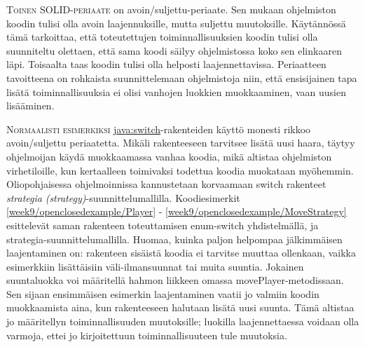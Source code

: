 \documentclass[openany]{book}
\newcommand{\newthought}[1]{\smallskip\textsc{#1}}
\newcommand{\eng}[1]{\textit{(#1)}}
\newcommand{\new}[1]{\textit{\gls{#1}}}
\newcommand{\neweng}[2]{\new{#1} \eng{#2}}
\newcommand{\java}[1]{\underline{\gls{java:#1}}}
\newcommand{\code}[3]{
	\begin{listing}
		\linespread{0.85}
		\inputminted{java}{OhjelmointiopasEsimerkit/src/#1/#2.java}
		\caption{#1: #3}
		\label{#1/#2}
	\end{listing}
}
\begin{document}
\newthought{Toinen SOLID-periaate} on \gls{avoin/suljettu-periaate}. Sen mukaan ohjelmiston
koodin tulisi olla avoin laajennuksille, mutta suljettu muutoksille. Käytännössä tämä tarkoittaa,
että toteutettujen toiminnallisuuksien koodin tulisi olla suunniteltu olettaen, että sama koodi
säilyy ohjelmistossa koko sen elinkaaren läpi. Toisaalta taas koodin tulisi olla helposti
laajennettavissa. Periaatteen tavoitteena on rohkaista suunnittelemaan ohjelmistoja niin, että
ensisijainen tapa lisätä toiminnallisuuksia ei olisi vanhojen luokkien muokkaaminen, vaan uusien
lisääminen.

\newthought{Normaalisti esimerkiksi} \java{switch}-rakenteiden käyttö monesti rikkoo 
avoin/suljettu periaatetta. Mikäli rakenteeseen tarvitsee lisätä uusi haara, täytyy ohjelmoijan
käydä muokkaamassa vanhaa koodia, mikä altistaa ohjelmiston virhetiloille, kun kertaalleen
toimivaksi todettua koodia muokataan myöhemmin. Oliopohjaisessa ohjelmoinnissa kannustetaan
korvaamaan switch rakenteet \neweng{strategia}{strategy}-suunnittelumallilla. Koodiesimerkit
\ref{week9/openclosedexample/Player} - \ref{week9/openclosedexample/MoveStrategy} esittelevät
saman rakenteen toteuttamisen enum-switch yhdistelmällä, ja strategia-suunnittelumallilla. Huomaa,
kuinka paljon helpompaa jälkimmäisen laajentaminen on: rakenteen sisäistä koodia ei tarvitse
muuttaa ollenkaan, vaikka esimerkkiin lisättäisiin väli-ilmansuunnat tai muita suuntia. Jokainen
suuntaluokka voi määritellä hahmon liikkeen omassa movePlayer-metodissaan. Sen sijaan
ensimmäisen esimerkin laajentaminen vaatii jo valmiin koodin muokkaamista aina, kun rakenteeseen
halutaan lisätä uusi suunta. Tämä altistaa jo määritellyn toiminnallisuuden muutoksille; luokilla
laajennettaessa voidaan olla varmoja, ettei jo kirjoitettuun toiminnallisuuteen tule muutoksia.

\code{week9/openclosedexample}{Player}{Pelaaja-luokka, jonka koordinaatteja esimerkissä pyritään
muuttamaan}
\code{week3/enumexample}{CompassPoint}{Ilmansuunnat \java{enum}-luokalla esiteltynä}
\code{week9/openclosedexample}{MoveSwitch}{Hahmon liikuttaminen \java{switch}-rakenteella ja
ilmansuuntia esittävällä \java{enum}-rakenteella}
\code{week9/openclosedexample}{MovementCommand}{Rajapintaluokka hahmon liikkuttamiseen
\gls{strategia}-suunnittelumallilla}
\code{week9/openclosedexample}{MoveNorth}{Liikkumiskomento pohjoiseen}
\code{week9/openclosedexample}{MoveEast}{Liikkumiskomento itään}
\code{week9/openclosedexample}{MoveSouth}{Liikkumiskomento etelään}
\code{week9/openclosedexample}{MoveWest}{Liikkumiskomento länteen}
\code{week9/openclosedexample}{MoveStrategy}{Hahmon liikuttaminen 
\gls{strategia}-suunnittelumallilla}
\end{document}
